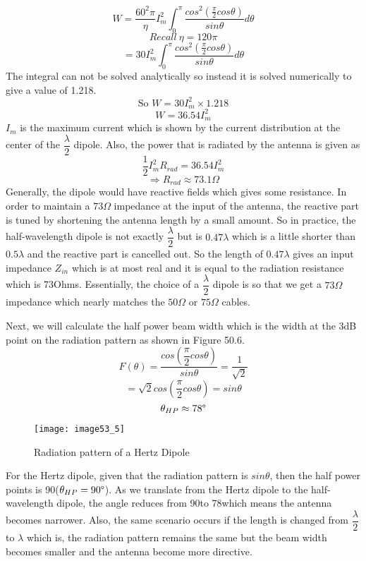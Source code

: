 \[ W = \frac{60^2\pi}{\eta} I_m^2 \int_{0}^{\pi} \frac{cos^2(\frac{\pi}{2}cos\theta)}{sin\theta}d\theta \]
\[Recall\ \eta = 120\pi \]
\[ = 30I_m^2 \int_{0}^{\pi}\dfrac{cos^2(\frac{\pi}{2}cos\theta)}{sin\theta}d\theta \]
The integral can not be solved analytically so instead it is solved numerically to give a value of 1.218.
\[ \text{So } W = 30I_m^2 \times 1.218 \]
\begin{equation}
W = 36.54I_m^2
\end{equation}
$I_m$ is the maximum current which is shown by the current distribution at the center of the $\dfrac{\lambda}{2}$ dipole.
Also, the power that is radiated by the antenna is given as $$\dfrac{1}{2}I_m^2 R_{rad} = 36.54I_m^2$$
\[ \Rightarrow R_{rad} \approx 73.1\Omega \]
Generally, the dipole would have reactive fields which gives some resistance. In order to maintain a $73\Omega$ impedance at the input of the antenna, the reactive part is tuned by shortening the antenna length by a small amount. So in practice, the half-wavelength dipole is not exactly $\dfrac{\lambda}{2}$ but is $0.47\lambda$ which is a little shorter than $0.5\lambda$ and the reactive part is cancelled out. So the length of $0.47\lambda$ gives an input impedance $Z_{in}$ which is at most real and it is equal to the radiation resistance which is 73Ohms. Essentially, the choice of a $\dfrac{\lambda}{2}$ dipole is so that we get a $73\Omega$ impedance which nearly matches the $50\Omega$ or $75\Omega$ cables.

Next, we will calculate the half power beam width which is the width at the 3dB point on the radiation pattern as shown in Figure 50.6.
\[ F(\theta) = \dfrac{cos(\dfrac{\pi}{2}cos\theta)}{sin\theta} = \dfrac{1}{\sqrt{2}} \]
\[ = \sqrt{2}cos(\dfrac{\pi}{2}cos\theta) = sin\theta \]
\[ \theta_{HP} \approx 78\text{\textdegree} \]
\begin{figure}
	\centering
	\texttt{[image: image53\_5]}
	\caption{Radiation pattern of a Hertz Dipole}
	\label{fig:fig5}
\end{figure}

For the Hertz dipole, given that the radiation pattern is $sin\theta$, then the half power points is 90\textdegree($\theta_{HP} = 90\text{\textdegree}$). As we translate from the Hertz dipole to the half-wavelength dipole, the angle reduces from 90\textdegree to 78\textdegree  which means the antenna becomes narrower. Also, the same scenario occurs if the length is changed from $\dfrac{\lambda}{2}$ to $\lambda$ which is, the radiation pattern remains the same but the beam width becomes smaller and the antenna become more directive.

